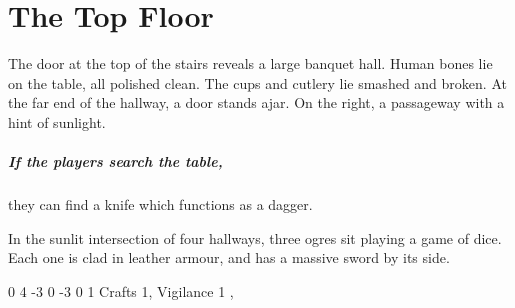 \chapter{The Top Floor}

\setcounter{list}{0}

\begin{figure*}[t]
	
\end{figure*}


\begin{boxtext}

	The door at the top of the stairs reveals a large banquet hall.
	Human bones lie on the table, all polished clean.
	The cups and cutlery lie smashed and broken.
	At the far end of the hallway, a door stands ajar.
	On the right, a passageway with a hint of sunlight.

\end{boxtext}

\paragraph{If the players search the table,}
they can find a knife which functions as a dagger.


\begin{boxtext}
	In the sunlit intersection of four hallways, three ogres sit playing a game of dice.
	Each one is clad in leather armour, and has a massive sword by its side.
\end{boxtext}

{0}%
{4}%
{{-3}%
{0}%
{-3}}%
{0}%
{1}%
{Crafts 1, Vigilance 1}%
{\greatsword, \partialleather}%
{}











